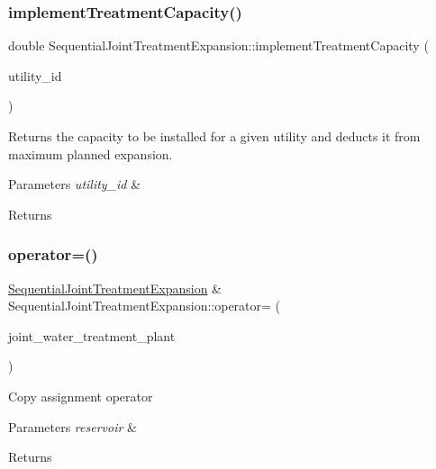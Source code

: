 \subsubsection{\texorpdfstring{implement\+Treatment\+Capacity()}{implementTreatmentCapacity()}}
{\footnotesize\ttfamily double Sequential\+Joint\+Treatment\+Expansion\+::implement\+Treatment\+Capacity (\begin{DoxyParamCaption}\item[{int}]{utility\+\_\+id }\end{DoxyParamCaption})}

Returns the capacity to be installed for a given utility and deducts it from maximum planned expansion. 
\begin{DoxyParams}{Parameters}
{\em utility\+\_\+id} & \\
\hline
\end{DoxyParams}
\begin{DoxyReturn}{Returns}

\end{DoxyReturn}
\mbox{\label{classSequentialJointTreatmentExpansion_a53413658de78fecdb2e0d451a20eb82c}} 
\subsubsection{\texorpdfstring{operator=()}{operator=()}}
{\footnotesize\ttfamily \mbox{\hyperlink{classSequentialJointTreatmentExpansion}{Sequential\+Joint\+Treatment\+Expansion}} \& Sequential\+Joint\+Treatment\+Expansion\+::operator= (\begin{DoxyParamCaption}\item[{const \mbox{\hyperlink{classSequentialJointTreatmentExpansion}{Sequential\+Joint\+Treatment\+Expansion}} \&}]{joint\+\_\+water\+\_\+treatment\+\_\+plant }\end{DoxyParamCaption})}

Copy assignment operator 
\begin{DoxyParams}{Parameters}
{\em reservoir} & \\
\hline
\end{DoxyParams}
\begin{DoxyReturn}{Returns}

\end{DoxyReturn}


